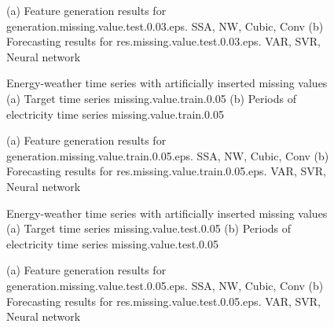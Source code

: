 \documentclass[12pt]{article}
\begin{document}
\begin{figure}
\centering
{}
\caption{(a)	Feature generation results for	generation.missing.value.test.0.03.eps.	SSA, NW, Cubic, Conv	(b)	Forecasting results for	res.missing.value.test.0.03.eps.	VAR, SVR, Neural network	}
\end{figure}


\begin{figure}
\centering
{}
\caption{Energy-weather time series with artificially inserted missing values	(a) Target time series	missing.value.train.0.05	(b) Periods of electricity time series	missing.value.train.0.05	}
\end{figure}


\begin{figure}
\centering
{}
\caption{(a)	Feature generation results for	generation.missing.value.train.0.05.eps.	SSA, NW, Cubic, Conv	(b)	Forecasting results for	res.missing.value.train.0.05.eps.	VAR, SVR, Neural network	}
\end{figure}


\begin{figure}
\centering
{}
\caption{Energy-weather time series with artificially inserted missing values	(a) Target time series	missing.value.test.0.05	(b) Periods of electricity time series	missing.value.test.0.05	}
\end{figure}


\begin{figure}
\centering
{}
\caption{(a)	Feature generation results for	generation.missing.value.test.0.05.eps.	SSA, NW, Cubic, Conv	(b)	Forecasting results for	res.missing.value.test.0.05.eps.	VAR, SVR, Neural network	}
\end{figure}
\end{document}
